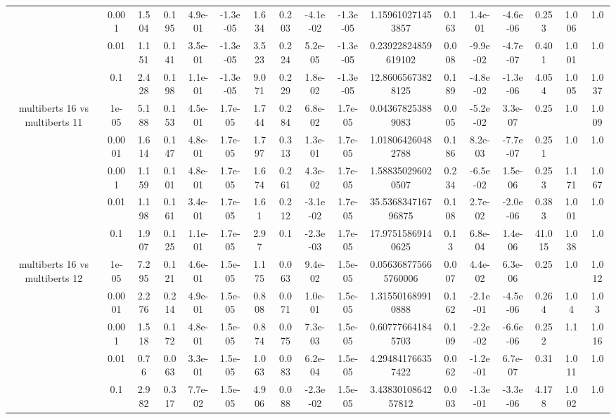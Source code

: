 \begin{tabular}{|c|c|c|c|c|c|c|c|c|c|c|c|c|c|c|c|c|}
 & 0.001 & 1.504 & 0.195 & 4.9e-01 & -1.3e-05 & 1.634 & 0.203 & -4.1e-02 & -1.3e-05 & 1.159610271453857 & 0.163 & 1.4e-01 & -4.6e-06 & 0.253 & 1.006 & 1.0 \\
 & 0.01 & 1.151 & 0.141 & 3.5e-01 & -1.3e-05 & 3.523 & 0.224 & 5.2e-05 & -1.3e-05 & 0.23922824859619102 & 0.008 & -9.9e-02 & -4.7e-07 & 0.401 & 1.001 & 1.0 \\
 & 0.1 & 2.428 & 0.198 & 1.1e-01 & -1.3e-05 & 9.071 & 0.229 & 1.8e-02 & -1.3e-05 & 12.86065673828125 & 0.189 & -4.8e-02 & -1.3e-06 & 4.054 & 1.005 & 1.037 \\
\hline
\multirow{5}{*}{multiberts 16 vs multiberts 11} & 1e-05 & 5.188 & 0.153 & 4.5e-01 & 1.7e-05 & 1.744 & 0.284 & 6.8e-02 & 1.7e-05 & 0.043678253889083 & 0.005 & -5.2e-02 & 3.3e-07 & 0.25 & 1.0 & 1.009 \\
 & 0.0001 & 1.614 & 0.147 & 4.8e-01 & 1.7e-05 & 1.797 & 0.313 & 1.3e-01 & 1.7e-05 & 1.018064260482788 & 0.186 & 8.2e-03 & -7.7e-07 & 0.251 & 1.0 & 1.0 \\
 & 0.001 & 1.159 & 0.101 & 4.8e-01 & 1.7e-05 & 1.674 & 0.261 & 4.3e-02 & 1.7e-05 & 1.588350296020507 & 0.234 & -6.5e-02 & 1.5e-06 & 0.253 & 1.171 & 1.067 \\
 & 0.01 & 1.198 & 0.161 & 3.4e-01 & 1.7e-05 & 1.61 & 0.212 & -3.1e-02 & 1.7e-05 & 35.536834716796875 & 0.108 & 2.7e-02 & -2.0e-06 & 0.383 & 1.001 & 1.0 \\
 & 0.1 & 1.907 & 0.125 & 1.1e-01 & 1.7e-05 & 2.97 & 0.1 & -2.3e-03 & 1.7e-05 & 17.97515869140625 & 0.13 & 6.8e-04 & 1.4e-06 & 41.015 & 1.038 & 1.0 \\
\hline
\multirow{5}{*}{multiberts 16 vs multiberts 12} & 1e-05 & 7.295 & 0.121 & 4.6e-01 & 1.5e-05 & 1.175 & 0.063 & 9.4e-02 & 1.5e-05 & 0.056368775665760006 & 0.007 & 4.4e-02 & 6.3e-06 & 0.25 & 1.0 & 1.012 \\
 & 0.0001 & 2.276 & 0.214 & 4.9e-01 & 1.5e-05 & 0.808 & 0.071 & 1.0e-01 & 1.5e-05 & 1.315501689910888 & 0.162 & -2.1e-01 & -4.5e-06 & 0.264 & 1.04 & 1.03 \\
 & 0.001 & 1.518 & 0.172 & 4.8e-01 & 1.5e-05 & 0.874 & 0.075 & 7.3e-03 & 1.5e-05 & 0.607776641845703 & 0.109 & -2.2e-02 & -6.6e-06 & 0.252 & 1.1 & 1.016 \\
 & 0.01 & 0.76 & 0.063 & 3.3e-01 & 1.5e-05 & 1.063 & 0.083 & 6.2e-04 & 1.5e-05 & 4.294841766357422 & 0.062 & -1.2e-01 & 6.7e-07 & 0.31 & 1.011 & 1.0 \\
 & 0.1 & 2.982 & 0.317 & 7.7e-02 & 1.5e-05 & 4.906 & 0.088 & -2.3e-02 & 1.5e-05 & 3.4383010864257812 & 0.003 & -1.3e-01 & -3.3e-06 & 4.178 & 1.002 & 1.0 \\

\end{tabular}
